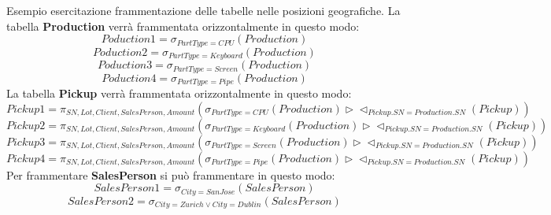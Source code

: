 \begin{esempio}
      Esempio esercitazione frammentazione delle tabelle nelle posizioni geografiche.
      La tabella \textbf{Production} verrà frammentata orizzontalmente in questo modo:
      \begin{equation*}
            Poduction1=\sigma_{PartType=CPU}(Production)
      \end{equation*}
      \begin{equation*}
            Poduction2=\sigma_{PartType=Keyboard}(Production)
      \end{equation*}
      \begin{equation*}
            Poduction3=\sigma_{PartType=Screen}(Production)
      \end{equation*}
      \begin{equation*}
            Poduction4=\sigma_{PartType=Pipe}(Production)
      \end{equation*}
      La tabella \textbf{Pickup} verrà frammentata orizzontalmente in questo modo:
      \begin{equation*}
            Pickup1=\pi_{SN, Lot, Client,SalesPerson, Amount}(\sigma_{PartType=CPU}(Production)\triangleright\triangleleft_{Pickup.SN=Production.SN}(Pickup))
      \end{equation*}
      \begin{equation*}
            Pickup2=\pi_{SN, Lot, Client,SalesPerson, Amount}(\sigma_{PartType=Keyboard}(Production)\triangleright\triangleleft_{Pickup.SN=Production.SN}(Pickup))
      \end{equation*}
      \begin{equation*}
            Pickup3=\pi_{SN, Lot, Client,SalesPerson, Amount}(\sigma_{PartType=Screen}(Production)\triangleright\triangleleft_{Pickup.SN=Production.SN}(Pickup))
      \end{equation*}
      \begin{equation*}
            Pickup4=\pi_{SN, Lot, Client,SalesPerson, Amount}(\sigma_{PartType=Pipe}(Production)\triangleright\triangleleft_{Pickup.SN=Production.SN}(Pickup))
      \end{equation*}
      Per frammentare \textbf{SalesPerson} si può frammentare in questo modo:
      \begin{equation*}
            SalesPerson1=\sigma_{City=SanJose}(SalesPerson)
      \end{equation*}
      \begin{equation*}
            SalesPerson2=\sigma_{City=Zurich \lor City=Dublin}(SalesPerson)

\end{equation*}
\end{esempio}
